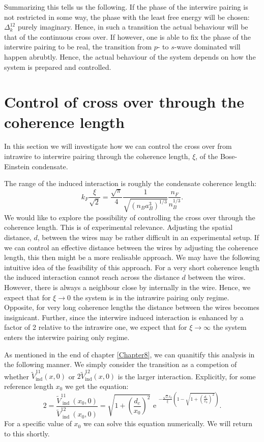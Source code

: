 Summarizing this tells us the following. If the phase of the interwire pairing is not restricted in some way, the phase with the least free energy will be chosen: $\Delta^{12}_k$ purely imaginary. Hence, in such a transition the actual behaviour will be that of the continuous cross over. If however, one is able to fix the phase of the interwire pairing to be real, the transition from $p$- to $s$-wave dominated will happen abrubtly. Hence, the actual behaviour of the system depends on how the system is prepared and controlled.  

\section{Control of cross over through the coherence length}
\label{sec.2wires_crossover_control_coherence_length}
In this section we will investigate how we can control the cross over from intrawire to interwire pairing through the coherence length, $\xi$, of the Bose-Einstein condensate.

The range of the induced interaction is roughly the condensate coherence length:
\begin{equation}
k_F\frac{\xi}{\sqrt{2}} = \frac{\sqrt{\pi}}{4}\frac{1}{\sqrt{(n_Ba_B^3)^{1/3}}}\frac{n_F}{n_B^{1/3}}.
\label{eq.RangefunctionofrBBnB}
\end{equation}
We would like to explore the possibility of controlling the cross over through the coherence length. This is of experimental relevance. Adjusting the spatial distance, $d$, between the wires may be rather difficult in an experimental setup. If we can control an effective distance between the wires by adjusting the coherence length, this then might be a more realisable approach. We may have the following intuitive idea of the feasibility of this approach. For a very short coherence length the induced interaction cannot reach across the distance $d$ between the wires. However, there is always a neighbour close by internally in the wire. Hence, we expect that for $\xi \to 0$ the system is in the intrawire pairing only regime. Opposite, for very long coherence lengths the distance between the wires becomes insignicant. Further, since the interwire induced interaction is enhanced by a factor of 2 relative to the intrawire one, we expect that for $\xi \to \infty$ the system enters the interwire pairing only regime. 

As mentioned in the end of chapter \ref{Chapter8}, we can quanitify this analysis in the following manner. We simply consider the transition as a competion of whether $\tilde{V}^{11}_{\text{ind}}(x,0)$ or $2\tilde{V}^{12}_{\text{ind}}(x,0)$ is the larger interaction. Explicitly, for some reference length $x_0$ we get the equation:
\begin{equation}
2 = \frac{ \tilde{V}^{11}_{\text{ ind }}(x_0, 0) }{ \tilde{V}^{12}_{\text{ ind }}(x_0, 0) } = \sqrt{ 1 + \left( \frac{ d_c }{ x_0 } \right)^2 }\text{ e }^{ -\frac{ \sqrt{2}x_0 }{ \xi } \left( 1 - \sqrt{ 1 + \left( \frac{ d_c }{ x_0 } \right)^2 } \right) }.
\label{eq.2wires.Vequal}
\end{equation}
For a specific value of $x_0$ we can solve this equation numerically. We will return to this shortly.  


